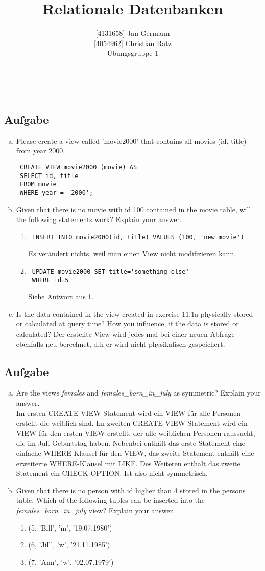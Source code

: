 \documentclass[11pt,a4paper,DIV=9]{scrartcl}
\author{{[}4131658{]} Jan Germann \\{[}4054962{]} Christian Ratz\\Übungsgruppe 1}
\title{Relationale Datenbanken}
\newcounter{temp}
\newcommand{\aufgabe}[1]{
  \setcounter{temp}{\value{subsection}}
  \setcounter{subsection}{#1}
  \addtocounter{subsection}{-1}
  \subsection{Aufgabe}
  \setcounter{subsection}{\value{temp}}
}
\renewcommand{\author}[1]{\renewcommand{\author}{#1}}
\renewcommand{\title}[1]{\renewcommand{\title}{#1}}
\newcommand{\makehomeworktitle}{
  \begin{minipage}[t]{6.5cm}
    \sf{\author}
  \end{minipage}
  \begin{minipage}[t]{6.5cm}
    \begin{flushright}
      \sf{\title\\\today}
    \end{flushright}
  \end{minipage}
  \\[0.2cm]
  \begin{center}
    \sf{
      \color{blue}{
        \LARGE{Aufgabenblatt \blattnr}
      }
    }
  \end{center}
  \vspace{0.1cm}
}
\begin{document}
\makehomeworktitle
   \aufgabe{1}
     \begin{enumerate}[a.]
 \item Please create a view called 'movie2000' that contains all movies (id, title) from year 2000.
 \begin{lstlisting}
 CREATE VIEW movie2000 (movie) AS
 SELECT id, title
 FROM movie
 WHERE year = '2000';
 \end{lstlisting}
 \item Given that there is no movie with id 100 contained in the movie table, will the following statements work? Explain your answer.
 \begin{enumerate}[1.]
 \item 
 \begin{lstlisting}
 INSERT INTO movie2000(id, title) VALUES (100, 'new movie')
 \end{lstlisting}
 Es ver\"andert nichts, weil man einen View nicht modifizieren kann.
 \item
 \begin{lstlisting}
 UPDATE movie2000 SET title='something else'
 WHERE id=5
 \end{lstlisting}
 Siehe Antwort aus 1.
 \end{enumerate}
 \item Is the data contained in the view created in exercise 11.1a physically stored or calculated at query time? How you influence, if the data is stored or calculated?
 Der erstellte View wird jedes mal bei einer neuen Abfrage ebenfalls neu berechnet, d.h er wird nicht physikalisch gespeichert.
 \end{enumerate}
\aufgabe{2}
  \begin{enumerate}[a.]
  \item Are the views \textit{females} and \textit{females\_born\_in\_july} as symmetric? Explain your answer. \\
  Im ersten CREATE-VIEW-Statement wird ein VIEW f\"ur alle Personen erstellt die weiblich sind.
  Im zweiten CREATE-VIEW-Statement wird ein VIEW f\"ur den ersten VIEW erstellt, der alle weiblichen Personen raussucht, die im Juli Geburtstag haben. Nebenbei enth\"alt das erste Statement eine einfache WHERE-Klausel f\"ur den VIEW, das zweite Statement enth\"alt eine erweiterte WHERE-Klausel mit LIKE. Des Weiteren enth\"alt das zweite Statement ein CHECK-OPTION. Ist also nicht symmetrisch.
  \item Given that there is no person with id higher than 4 stored in the persons table. Which of the following tuples can be inserted into the \textit{females\_born\_in\_july} view? Explain your answer.
  \begin{enumerate}[1.]  %
  \item (5, 'Bill', 'm', '19.07.1980')
  \item (6, 'Jill', 'w', '21.11.1985')
  \item (7, 'Ann', 'w', '02.07.1979')
  \end{enumerate}
  \end{enumerate}
\end{document}

